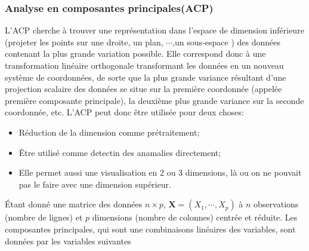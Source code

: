 \subsubsection*{Analyse en composantes principales(ACP)}
%
L'ACP cherche à trouver une représentation dans l’espace de dimension inférieure (projeter les points sur une droite, un plan, $\cdots$,un sous-espace ) des données contenant la plus grande variation possible. Elle correspond donc à une  transformation linéaire orthogonale transformant les données en un nouveau système de coordonnées, de sorte que la plus grande variance résultant d’une projection scalaire des données se situe sur la première coordonnée (appelée première composante principale), la deuxième plus grande variance sur la seconde coordonnée, etc. L'ACP peut donc être utilisée pour deux choses:
\begin{itemize}
    \item Réduction de la dimension comme prétraitement;
    \item Être utilisé comme detectin des anamalies directement;
    \item  Elle permet aussi une visualisation en 2 ou 3 dimensions, là ou on ne pouvait pas le faire avec une dimension supérieur.
\end{itemize}
Étant donné une matrice des données $n\times p$, $\textbf{X}=(X_1,\cdots,X_p)$ à $n$ observations (nombre de lignes) et $p$ dimensions (nombre de colonnes) centrée et réduite. Les composantes principales, qui sont une combinaisons linéaires des variables, sont données par les variables  suivantes

